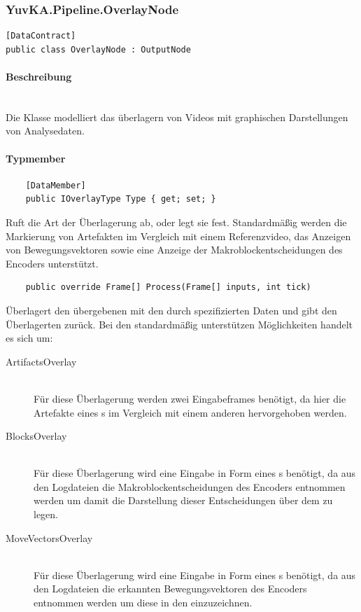 \subsubsection{YuvKA.Pipeline.OverlayNode}

\begin{verbatim}
[DataContract]
public class OverlayNode : OutputNode
\end{verbatim}

\paragraph{Beschreibung}~\\
Die Klasse  modelliert das überlagern von Videos mit graphischen Darstellungen von Analysedaten.

\paragraph{Typmember}
\begin{itemize}

	\begin{verbatim}
	[DataMember]
	public IOverlayType Type { get; set; }
	\end{verbatim}
	Ruft die Art der Überlagerung ab, oder legt sie fest. Standardmäßig werden die Markierung von Artefakten im Vergleich mit einem Referenzvideo, das Anzeigen von Bewegungsvektoren sowie eine Anzeige der Makroblockentscheidungen des Encoders unterstützt.

	\begin{verbatim}
	public override Frame[] Process(Frame[] inputs, int tick)
	\end{verbatim}
	Überlagert den übergebenen  mit den durch  spezifizierten Daten und gibt den Überlagerten  zurück. Bei den standardmäßig unterstützen Möglichkeiten handelt es sich um:
	\begin{description}
		\item[ArtifactsOverlay]~\\
			Für diese Überlagerung werden zwei Eingabeframes benötigt, da hier die Artefakte eines s im Vergleich mit einem anderen hervorgehoben werden.
		\item[BlocksOverlay]~\\
			Für diese Überlagerung wird eine Eingabe in Form eines s benötigt, da aus den Logdateien die Makroblockentscheidungen des Encoders entnommen werden um damit die Darstellung dieser Entscheidungen über dem  zu legen.
		\item[MoveVectorsOverlay]~\\
			Für diese Überlagerung wird eine Eingabe in Form eines s benötigt, da aus den Logdateien die erkannten Bewegungsvektoren des Encoders entnommen werden um diese in den  einzuzeichnen.
	\end{description}
	
\end{itemize}
